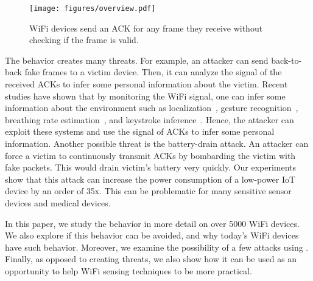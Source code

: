 \begin{figure}[t!]
\centering
        \centering
        \texttt{[image: figures/overview.pdf]}
        \caption{WiFi devices send an ACK for any frame they receive without checking if the frame is valid.}
        \label{fig:idea}
\end{figure}  


The  \name behavior creates many threats. 
For example, an attacker can send back-to-back fake frames to a victim device. 
Then, it can analyze the signal of the received ACKs to infer some personal information about the victim. Recent studies have shown that by monitoring the WiFi signal, one can infer some information about the environment such as localization~\cite{localization-1, localization-2}, gesture recognition~\cite{gesture-1, gesture-2}, breathing rate estimation~\cite{breathing-1, breathing-2}, and keystroke inference~\cite{windtalker}. Hence, the attacker can exploit these systems and use the signal of ACKs to infer some personal information. 
Another possible threat is the battery-drain attack.
An attacker can force a victim to continuously transmit ACKs by bombarding the victim with fake packets.
This would drain victim's battery very quickly. Our experiments show that this attack can increase the power consumption of a low-power IoT device by an order of 35x. This can be problematic for many sensitive sensor devices and medical devices. 

In this paper, we study the \name behavior in more detail on over 5000 WiFi devices. 
We also explore if this behavior can be avoided, and why today's WiFi devices have such behavior. 
Moreover, we examine the possibility of a few attacks using \name. Finally, as opposed to creating threats, we also show how it can be used as an opportunity to help WiFi sensing techniques to be more practical.




    
